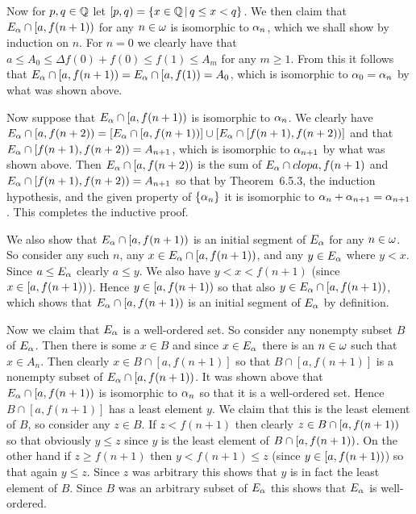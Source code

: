 {{    Now for $p,q \in \mathbb{Q}$ let $[p,q) = \left\{ x \in \mathbb{Q} \,|\, q \leq x < q \right\}$.
    We then claim that $E_\alpha \cap [a, f(n+1))$ for any $n \in \omega$ is isomorphic to $\alpha_n$, which we shall show by induction on $n$.
    For $n=0$ we clearly have that $a \leq A_0 \leq \Delta f(0) + f(0) \leq f(1) \leq A_m$ for any $m \geq 1$.
    From this it follows that $E_\alpha \cap [a, f(n+1)) = E_\alpha \cap [a, f(1)) = A_0$, which is isomorphic to $\alpha_0 = \alpha_n$ by what was shown above.
    
    Now suppose that $E_\alpha \cap [a, f(n+1))$ is isomorphic to $\alpha_n$.
    We clearly have $E_\alpha \cap [a, f(n+2)) = \left[ E_\alpha \cap [a, f(n+1)) \right] \cup \left[ E_\alpha \cap [f(n+1), f(n+2)) \right]$ and that $E_\alpha \cap [f(n+1), f(n+2)) = A_{n+1}$, which is isomorphic to $\alpha_{n+1}$ by what was shown above.
    Then $E_\alpha \cap [a, f(n+2))$ is the sum of $E_\alpha \cap clop{a, f(n+1)}$ and $E_\alpha \cap [f(n+1), f(n+2)) = A_{n+1}$ so that by Theorem~6.5.3, the induction hypothesis, and the given property of $\left\{ \alpha_n \right\}$ it is isomorphic to $\alpha_n + \alpha_{n+1} = \alpha_{n+1}$.
    This completes the inductive proof.
    
    We also show that $E_\alpha \cap [a, f(n+1))$ is an initial segment of $E_\alpha$ for any $n \in \omega$.
    So consider any such $n$, any $x \in E_\alpha \cap [a, f(n+1))$, and any $y \in E_\alpha$ where $y < x$.
    Since $a \leq E_\alpha$ clearly $a \leq y$.
    We also have $y < x < f(n+1)$ (since $x \in [a, f(n+1))$).
    Hence $y \in [a, f(n+1))$ so that also $y \in E_\alpha \cap [a, f(n+1))$, which shows that $E_\alpha \cap [a, f(n+1))$ is an initial segment of $E_\alpha$ by definition.
    
    Now we claim that $E_\alpha$ is a well-ordered set.
    So consider any nonempty subset $B$ of $E_\alpha$.
    Then there is some $x \in B$ and since $x \in E_\alpha$ there is an $n \in \omega$ such that $x \in A_n$.
    Then clearly $x \in B \cap [a, f(n+1)]$ so that $B \cap [a, f(n+1)]$ is a nonempty subset of $E_\alpha \cap [a, f(n+1))$.
    It was shown above that $E_\alpha \cap [a, f(n+1))$ is isomorphic to $\alpha_n$ so that it is a well-ordered set.
    Hence $B \cap [a, f(n+1)]$ has a least element $y$.
    We claim that this is the least element of $B$, so consider any $z \in B$.
    If $z < f(n+1)$ then clearly $z \in B \cap [a, f(n+1))$ so that obviously $y \leq z$ since $y$ is the least element of $B \cap [a, f(n+1))$.
    On the other hand if $z \geq f(n+1)$ then $y < f(n+1) \leq z$ (since $y \in [a, f(n+1))$) so that again $y \leq z$.
    Since $z$ was arbitrary this shows that $y$ is in fact the least element of $B$.
    Since $B$ was an arbitrary subset of $E_\alpha$ this shows that $E_\alpha$ is well-ordered.

}}

